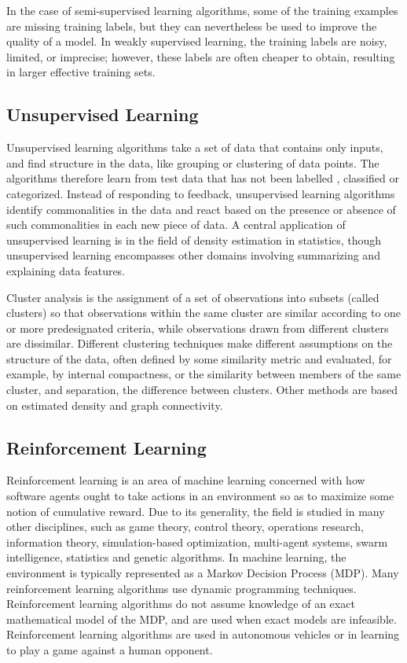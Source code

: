 \documentclass{report}
\begin{document}
In the case of semi-supervised learning algorithms, some of the training examples are missing training labels, but they can nevertheless be used to improve the quality of a model. In weakly supervised learning, the training labels are noisy, limited, or imprecise; however, these labels are often cheaper to obtain, resulting in larger effective training sets.

\subsection{Unsupervised Learning}
Unsupervised learning algorithms take a set of data that contains only inputs, and find structure in the data, like grouping or clustering of data points. The algorithms therefore learn from test data that has not been labelled , classified or categorized. Instead of responding to feedback, unsupervised learning algorithms identify commonalities in the data and react based on the presence or absence of such commonalities in each new piece of data. A central application of unsupervised learning is in the field of density estimation in statistics, though unsupervised learning encompasses other domains involving summarizing and explaining data features.

Cluster analysis is the assignment of a set of observations into subsets (called clusters) so that observations within the same cluster are similar according to one or more predesignated criteria, while observations drawn from different clusters are dissimilar. Different clustering techniques make different assumptions on the structure of the data, often defined by some similarity metric and evaluated, for example, by internal compactness, or the similarity between members of the same cluster, and separation, the difference between clusters. Other methods are based on estimated density and graph connectivity.

\subsection{Reinforcement Learning}
Reinforcement learning is an area of machine learning concerned with how software agents ought to take actions in an environment so as to maximize some notion of cumulative reward. Due to its generality, the field is studied in many other disciplines, such as game theory, control theory, operations research, information theory, simulation-based optimization, multi-agent systems, swarm intelligence, statistics and genetic algorithms. In machine learning, the environment is typically represented as a Markov Decision Process (MDP). Many reinforcement learning algorithms use dynamic programming techniques. Reinforcement learning algorithms do not assume knowledge of an exact mathematical model of the MDP, and are used when exact models are infeasible. Reinforcement learning algorithms are used in autonomous vehicles or in learning to play a game against a human opponent.
\end{document}
